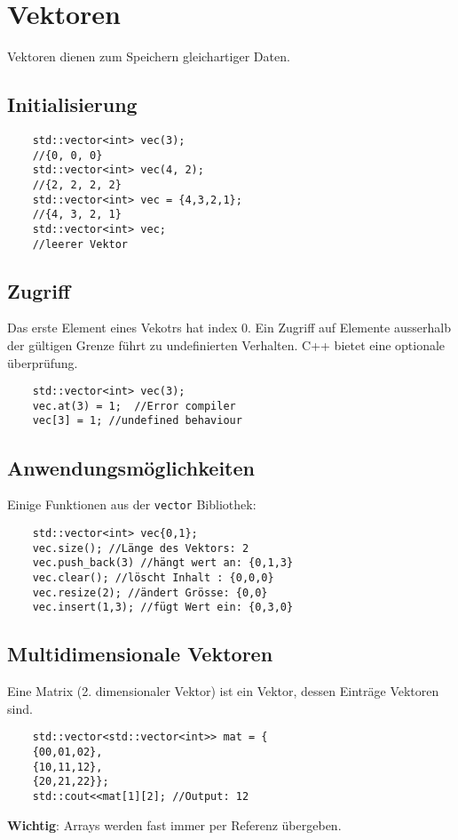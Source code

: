 \section{Vektoren} 
Vektoren dienen zum Speichern gleichartiger Daten.
\subsection{Initialisierung}
\begin{lstlisting}
	std::vector<int> vec(3);
	//{0, 0, 0}
	std::vector<int> vec(4, 2);
	//{2, 2, 2, 2}
	std::vector<int> vec = {4,3,2,1};
	//{4, 3, 2, 1}
	std::vector<int> vec;
	//leerer Vektor
\end{lstlisting}
\subsection{Zugriff}
Das erste Element eines Vekotrs hat index 0. Ein Zugriff auf Elemente ausserhalb der gültigen Grenze führt zu undefinierten Verhalten. C++ bietet eine optionale überprüfung.
\begin{lstlisting}
	std::vector<int> vec(3);
	vec.at(3) = 1;	//Error compiler
	vec[3] = 1; //undefined behaviour
\end{lstlisting}
\subsection{Anwendungsmöglichkeiten}
Einige Funktionen aus der \texttt{vector} Bibliothek:
\begin{lstlisting}
	std::vector<int> vec{0,1};
	vec.size(); //Länge des Vektors: 2
	vec.push_back(3) //hängt wert an: {0,1,3}
	vec.clear(); //löscht Inhalt : {0,0,0}
	vec.resize(2); //ändert Grösse: {0,0}
	vec.insert(1,3); //fügt Wert ein: {0,3,0}
\end{lstlisting}
\subsection{Multidimensionale Vektoren}
Eine Matrix (2. dimensionaler Vektor) ist ein Vektor, dessen Einträge Vektoren sind.
\begin{lstlisting}
	std::vector<std::vector<int>> mat = {
	{00,01,02},
	{10,11,12},
	{20,21,22}};
	std::cout<<mat[1][2]; //Output: 12
\end{lstlisting}
\textbf{Wichtig}: Arrays werden fast immer per Referenz übergeben.




